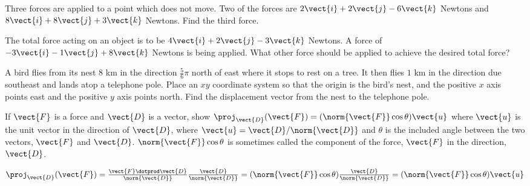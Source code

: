 \begin{ex} Three forces are applied to a point which does not move. Two of the
forces are $2 \vect{i}+2 \vect{j} -6 \vect{k}$ Newtons and $8 \vect{i}+ 8 \vect{j}+ 3 \vect{k}$ Newtons. Find
the third force. \vspace{1mm}
\end{ex}

\begin{ex} The total force acting on an object is to be $4 \vect{i}+
 2 \vect{j} -3 \vect{k}$ Newtons. A force
of $-3 \vect{i} -1 \vect{j}+ 8
\vect{k}$ Newtons is being applied. What other force should be applied to
achieve the desired total force? \vspace{1mm}
\end{ex}

\begin{ex} A bird flies from its nest $8$ km in the direction $\frac{5}{6}\pi $
north of east where it stops to rest on a tree. It then flies $1$ km in the
direction due southeast and lands atop a telephone pole. Place an $xy$
coordinate system so that the origin is the bird's nest, and the positive 
$x$ axis points east and the positive $y$ axis points north. Find the
displacement vector from the nest to the telephone pole. \vspace{1mm}
\end{ex}


\begin{ex} If $\vect{F}$ is a force and $\vect{D}$ is a vector, show 
$\proj_{\vect{D}}(\vect{F}) =(\norm{\vect{F}
} \cos \theta) \vect{u}$ where $\vect{u}$ is the unit
vector in the direction of $\vect{D}$, where $\vect{u}=\vect{D}/\norm{\vect{D}
} $ and $\theta $ is the included angle between the two vectors, 
$\vect{F}$ and $\vect{D}$. $\norm{\vect{F}} \cos \theta $
is sometimes called the component
 of the force, $\vect{F}$ in the direction, $\vect{D}$.
\begin{sol}
$\proj_{\vect{D}}(\vect{F}) = \frac{\vect{F}\dotprod
\vect{D}}{\norm{\vect{D}} }\frac{\vect{D}}{\norm{\vect{D}
} }=(\norm{\vect{F}} \cos \theta)
\frac{\vect{D}}{\norm{\vect{D}} }=(\norm{
\vect{F}} \cos \theta) \vect{u}$
\end{sol}
\end{ex}

